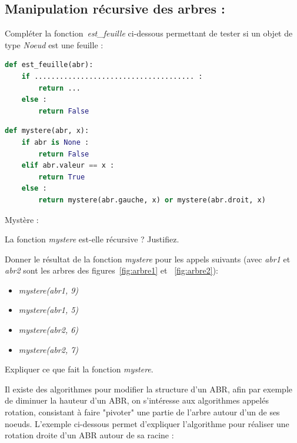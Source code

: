 \documentclass[a4paper, noanswers, addpoints, 12pt]{exam}
\begin{document}
\begin{questions}
\section{Manipulation récursive des arbres : }

\question[1] Compléter la fonction~\textit{est\_feuille} ci-dessous permettant de tester si un objet de type  \textit{Noeud} est une feuille :
\begin{lstlisting}[style=mystyle, language=Python]
def est_feuille(abr):
    if ...................................... :
        return ...
    else :
        return False
\end{lstlisting}

\vfill

\begin{lstlisting}[style=mystyle, language=Python]
def mystere(abr, x):
    if abr is None :
        return False
    elif abr.valeur == x :
        return True
    else :
        return mystere(abr.gauche, x) or mystere(abr.droit, x)
\end{lstlisting}

\question[3] Mystère :
\begin{parts}
    \item La fonction \textit{mystere} est-elle récursive ? Justifiez.
    \item Donner le résultat de la fonction \textit{mystere} pour les appels suivants (avec \textit{abr1} et \textit{abr2} sont les arbres des figures~\ref{fig:arbre1} et ~\ref{fig:arbre2}):
    \begin{itemize}
        \item \textit{ mystere(abr1, 9)}
        \item \textit{ mystere(abr1, 5)}
        \item \textit{ mystere(abr2, 6)}
        \item \textit{ mystere(abr2, 7)}
    \end{itemize}
    \item Expliquer ce que fait la fonction \textit{mystere}.
\end{parts}

Il existe des algorithmes pour modifier la structure d'un ABR, afin par exemple de diminuer la hauteur d'un ABR, on s'intéresse aux algorithmes appelés rotation, consistant à faire "pivoter" une partie de l'arbre autour d'un de ses noeuds.
L'exemple ci-dessous permet d'expliquer l'algorithme pour réaliser une rotation droite d'un ABR autour de sa racine :


\end{questions}
\end{document}
